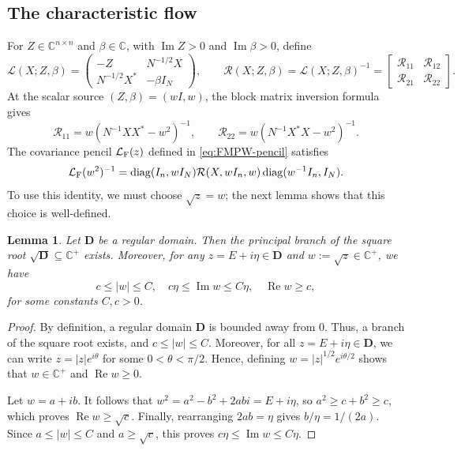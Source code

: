 \documentclass[11pt,reqno]{amsart}
\def\C{\mathbb{C}}
\def\cL{\mathcal{L}}
\def\cR{\mathcal{R}}
\def\bD{\mathbf{D}}
\def\Im{\operatorname{Im}}
\def\Re{\operatorname{Re}}
\def\diag{\operatorname{diag}}
\newtheorem{lemma}[theorem]{Lemma}
\theoremstyle{definition}
\numberwithin{equation}{section}
\numberwithin{figure}{section}
\begin{document}
\subsection{The characteristic flow}\label{sec:block}
For $Z\in\C^{n\times n}$ and $\beta\in\C$, with $\Im Z>0$ and $\Im\beta>0$, define
\begin{equation} \label{eq:full-L}
 \cL(X;Z,\beta) =
 \begin{pmatrix}
   -Z&N^{-1/2}X\\
   N^{-1/2}X^*&-\beta I_N
 \end{pmatrix},
 \qquad
 \cR(X;Z,\beta)=\cL(X;Z,\beta)^{-1}=\begin{bmatrix}
     \cR_{11} & \cR_{12}\\
     \cR_{21} & \cR_{22}
 \end{bmatrix}.
\end{equation}
At the scalar source $(Z,\beta)=(wI,w)$, the block matrix inversion formula gives
\begin{equation} \label{eq:singular-linearization-blocks}
 \cR_{11}=w(N^{-1}XX^*-w^2)^{-1},\qquad \cR_{22}=w(N^{-1}X^*X-w^2)^{-1}.
\end{equation}
The covariance pencil $\cL_{\rm F}(z)$ defined in \eqref{eq:FMPW-pencil} satisfies 
\begin{equation}\label{eq:linear-pencil-equivalence}
    \cL_{\rm F}(w^2)^{-1} =\diag(I_n,wI_N)\cR(X,wI_n,w)\diag(w^{-1}I_n,I_N).
\end{equation}
To use this identity, we must choose $\sqrt{z}=w$; the next lemma shows that this choice is well-defined.
\begin{lemma}\label{lem:z-companion-w}
Let $\bD$ be a regular domain. Then the principal branch of the square root $\sqrt{\bD}\subseteq\C^+$ exists. Moreover, for any $z=E+i\eta\in\bD$ and $w:=\sqrt{z}\in\C^+$, we have
\[
    c\leq|w|\leq C,\quad c\eta\leq\Im{w}\leq C\eta,\quad \Re{w}\geq c,
\]
for some constants $C,c>0$.
\end{lemma}
\begin{proof}
By definition, a regular domain $\bD$ is bounded away from $0$. Thus, a branch of the square root exists, and $c\leq|w|\leq C$. Moreover, for all $z=E+i\eta\in\bD$, we can write $z=|z|e^{i\theta}$ for some $0<\theta<\pi/2$. Hence, defining $w=|z|^{1/2}e^{i\theta/2}$ shows that $w\in\C^+$ and $\Re w\geq 0$.

Let $w=a+ib$. It follows that $w^2=a^2-b^2+2abi=E+i\eta$, so $a^2\geq c+b^2\geq c$, which proves $\Re w\geq \sqrt{c}$. Finally, rearranging $2ab=\eta$ gives $b/\eta=1/(2a)$. Since $a\leq |w|\leq C$ and $a\geq \sqrt{c}$, this proves $c\eta\leq\Im{w}\leq C\eta$.
\end{proof}
\end{document}
